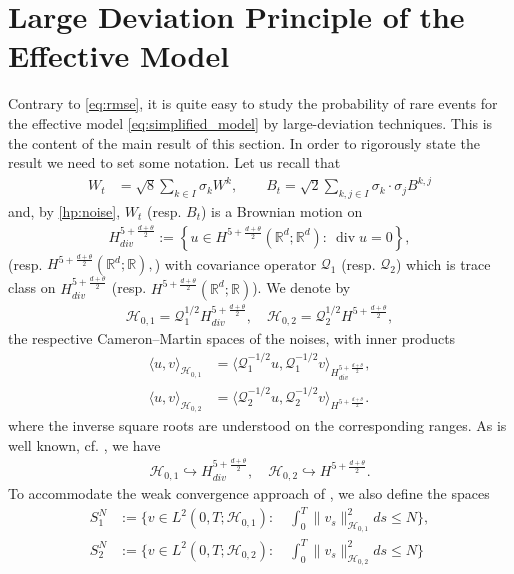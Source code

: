 \documentclass[a4paper,10pt]{amsart}
\newcommand{\R}{\mathbb{R}}
\theoremstyle{remark}
\numberwithin{equation}{section}
\begin{document}
\section{Large Deviation Principle of the Effective Model}\label{sec_ldp}
Contrary to \eqref{eq:rmse}, it is quite easy to study the probability of rare events for the effective model \eqref{eq:simplified_model} by large-deviation techniques.
This is the content of the main result of this section. In order to rigorously state the result we need to set some notation. Let us recall that
\begin{align*}
    W_t&=\sqrt{8}\sum_{k\in I}\sigma_k W^k,\qquad
    B_t=\sqrt{2}\sum_{k,j\in I}\sigma_k\cdot\sigma_j B^{k,j}
\end{align*}
and, by \cref{hp:noise}, $W_t$ (resp. $B_t$) is a Brownian motion on 
\begin{align*}
    H^{5+\frac{d+\theta}{2}}_{div}:=\left\{u\in H^{5+\frac{d+\theta}{2}}(\R^d;\R^d):\ \operatorname{div}u=0 \right\},
\end{align*}
(resp. $H^{5+\frac{d+\theta}{2}}(\R^d;\R),$) with covariance operator $\mathcal{Q}_1$ (resp. $\mathcal{Q}_2$) which is trace class on $H^{5+\frac{d+\theta}{2}}_{div}$ (resp. $H^{5+\frac{d+\theta}{2}}(\R^d;\R)$).
We denote by
\begin{align*}
\mathcal{H}_{0,1}
=\mathcal{Q}_1^{1/2}H^{5+\frac{d+\theta}{2}}_{div},\quad
\mathcal{H}_{0,2}
=\mathcal{Q}_2^{1/2}H^{5+\frac{d+\theta}{2}},
\end{align*}
the respective Cameron--Martin spaces of the noises, with inner products
\begin{align*}
    \langle u,v\rangle_{\mathcal{H}_{0,1}}
    &=\langle \mathcal{Q}_1^{-1/2}u,\mathcal{Q}_1^{-1/2}v
    \rangle_{H^{5+\frac{d+\theta}{2}}_{div}},\\
    \langle u,v\rangle_{\mathcal{H}_{0,2}}
    &=\langle \mathcal{Q}_2^{-1/2}u,\mathcal{Q}_2^{-1/2}v
    \rangle_{H^{5+\frac{d+\theta}{2}}}.
\end{align*}
where the inverse square roots are understood on the corresponding ranges.
As is well known, cf. \cite[Chapter 2]{da2014stochastic}, we have
\begin{align}\label{embedding_cameron_martin}
  \mathcal{H}_{0,1}\hookrightarrow  H^{5+\frac{d+\theta}{2}}_{div},\quad \mathcal{H}_{0,2}\hookrightarrow H^{5+\frac{d+\theta}{2}}. 
\end{align}
To accommodate the weak convergence approach of \cite{LDPweak_convergence}, we also define the spaces \begin{align*}
  S^N_1&:=\Big\{v\in L^2(0,T;\mathcal{H}_{0,1}):\quad \int_0^T \lVert v_s\rVert_{\mathcal{H}_{0,1}}^2 ds \leq N\Big\},\\
  S^N_2&:=\Big\{v\in L^2(0,T;\mathcal{H}_{0,2}):\quad \int_0^T \lVert v_s\rVert_{\mathcal{H}_{0,2}}^2 ds \leq N\Big\}
\end{align*}
\end{document}
